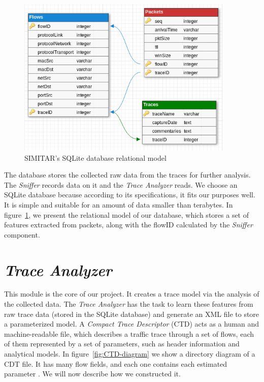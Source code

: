 \begin{figure}[ht!]
        \centering
        \includegraphics[height=3.0in]{figures/ch3/database-relational-model}
        \caption{SIMITAR's SQLite database relational model}
    \label{fig:simitar-database}
\end{figure}




The database stores the collected raw data from the traces for further analysis. The \textit{Sniffer} records data on it and the  \textit{Trace Analyzer} reads. We choose an SQLite database because according to its specifications\cite{web-sqlite}, it fits our purposes well. It is simple and suitable for an amount of data smaller than terabytes. In figure~\ref{fig:simitar-database}, we present the relational model of our database, which stores a set of features extracted from packets, along with the flowID calculated by the \textit{Sniffer} component.


\section{ \textit{Trace Analyzer} }


This module is the core of our project. It creates a trace model via the analysis of the collected data. The \textit{Trace Analyzer} has the task to learn these features from raw trace data (stored in the SQLite database) and generate an XML file to store a parameterized model. A \textit{Compact Trace Descriptor} (CTD) acts as a human and machine-readable file, which describes a traffic trace through a set of flows, each of them represented by a set of parameters, such as header information and analytical models. In figure~\ref{fig:CTD-diagram} we show a directory diagram of a CDT file. It has many flow fields, and each one contains each estimated parameter . We will now describe how we constructed it.


